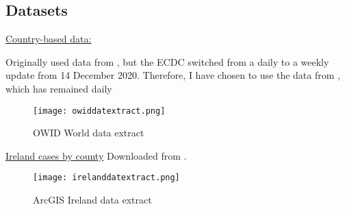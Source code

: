 \subsection{Datasets}

\underline{Country-based data:}

Originally used data from \cite{ecdcdata},  but the ECDC switched from a daily to a weekly update from 14 December 2020. Therefore, I have chosen to use the data from  \cite{countrydata}, which has remained daily

\begin{figure}[!htb]
  \texttt{[image: owiddatextract.png]} \label{fig:owiddatextract}
\endminipage
\caption{OWID World data extract}
\end{figure}

\underline{Ireland cases by county}
Downloaded from \cite{irelanddata}.

\begin{figure}[!htb]
  \texttt{[image: irelanddatextract.png]} \label{fig:irelanddatextract}
\endminipage
\caption{ArcGIS Ireland data extract}
\end{figure}

